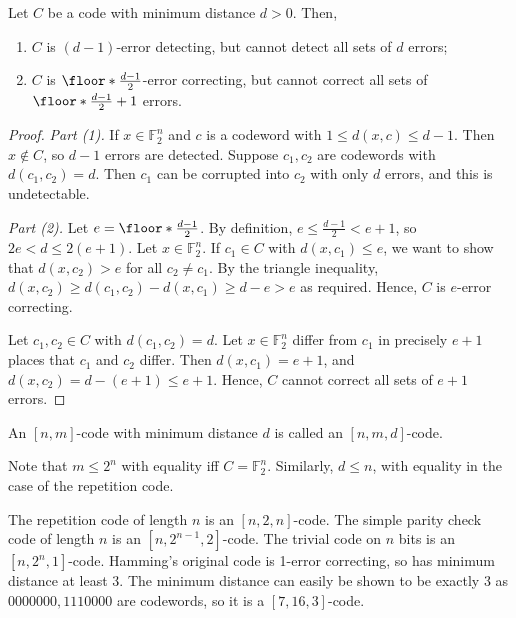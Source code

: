 \begin{lemma}
    Let $C$ be a code with minimum distance $d > 0$.
    Then,
    \begin{enumerate}
        \item $C$ is $(d-1)$-error detecting, but cannot detect all sets of $d$ errors;
        \item $C$ is $\floor*{\frac{d-1}{2}}$-error correcting, but cannot correct all sets of $\floor*{\frac{d-1}{2}} + 1$ errors.
    \end{enumerate}
\end{lemma}

\begin{proof}
    \emph{Part (1).}
    If $x \in \mathbb F_2^n$ and $c$ is a codeword with $1 \leq d(x,c) \leq d - 1$.
    Then $x \not\in C$, so $d - 1$ errors are detected.
    Suppose $c_1, c_2$ are codewords with $d(c_1, c_2) = d$.
    Then $c_1$ can be corrupted into $c_2$ with only $d$ errors, and this is undetectable.

    \emph{Part (2).}
    Let $e = \floor*{\frac{d-1}{2}}$.
    By definition, $e \leq \frac{d-1}{2} < e + 1$, so $2e < d \leq 2(e+1)$.
    Let $x \in \mathbb F_2^n$.
    If $c_1 \in C$ with $d(x,c_1) \leq e$, we want to show that $d(x,c_2) > e$ for all $c_2 \neq c_1$.
    By the triangle inequality, $d(x,c_2) \geq d(c_1,c_2) - d(x,c_1) \geq d - e > e$ as required.
    Hence, $C$ is $e$-error correcting.

    Let $c_1, c_2 \in C$ with $d(c_1, c_2) = d$.
    Let $x \in \mathbb F_2^n$ differ from $c_1$ in precisely $e + 1$ places that $c_1$ and $c_2$ differ.
    Then $d(x,c_1) = e + 1$, and $d(x,c_2) = d - (e+1) \leq e + 1$.
    Hence, $C$ cannot correct all sets of $e + 1$ errors.
\end{proof}

\begin{definition}[{$[n,m,d]$}-code]
    An $[n,m]$-code with minimum distance $d$ is called an $[n,m,d]$-code.
\end{definition}

Note that $m \leq 2^n$ with equality iff $C = \mathbb F_2^n$.
Similarly, $d \leq n$, with equality in the case of the repetition code.

\begin{example}
    The repetition code of length $n$ is an $[n,2,n]$-code.
    The simple parity check code of length $n$ is an $[n,2^{n-1},2]$-code.
    The trivial code on $n$ bits is an $[n,2^n,1]$-code.
    Hamming's original code is 1-error correcting, so has minimum distance at least 3.
    The minimum distance can easily be shown to be exactly 3 as $0000000, 1110000$ are codewords, so it is a $[7,16,3]$-code.
\end{example}

